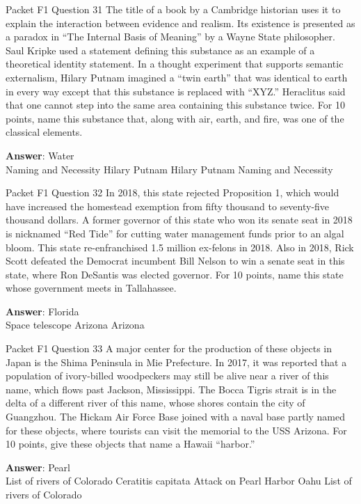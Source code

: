 \begin{frame}{Packet F1 Question 31}
The title of a book by a Cambridge historian uses it to explain the interaction between evidence and realism. Its existence is presented as a paradox in ``The Internal Basis of Meaning'' by a Wayne State philosopher. Saul Kripke used a statement defining this substance as an example   of a theoretical identity   statement. In a thought experiment that supports semantic externalism, Hilary   Putnam imagined a “twin earth” that   was identical to earth in every way except that this substance is replaced with   “XYZ.” Heraclitus said that one cannot step into the same area containing this substance twice. For 10 points, name this substance that, along with air, earth,   and fire, was one of the classical elements.  

\textbf{Answer}: Water\\
 Naming and Necessity
 Hilary Putnam
 Hilary Putnam
 Naming and Necessity
\end{frame}

\begin{frame}{Packet F1 Question 32}
In 2018, this state rejected   Proposition 1, which would have increased the homestead exemption from fifty thousand to seventy-five thousand dollars. A former governor of this state who won its senate seat in 2018 is nicknamed “Red Tide” for cutting water management funds prior to an algal bloom. This state re-enfranchised 1.5 million ex-felons in 2018. Also in 2018, Rick Scott defeated     the Democrat   incumbent Bill Nelson to win a senate seat in this state, where Ron DeSantis was   elected governor. For 10 points, name this state whose government meets in Tallahassee.  

\textbf{Answer}: Florida\\
 Space telescope
 Arizona
 Arizona
\end{frame}

\begin{frame}{Packet F1 Question 33}
A major center for the production of these objects in Japan is the Shima Peninsula in Mie Prefecture. In 2017, it was reported that a population of ivory-billed woodpeckers may still be alive near a river of this name, which flows past Jackson, Mississippi. The Bocca Tigris strait is in the delta of a different river of this name, whose shores   contain the city of Guangzhou. The Hickam Air Force Base joined with a naval base partly named for these objects, where tourists can visit the memorial to the USS Arizona. For 10 points, give these objects that name a Hawaii “harbor.”        

\textbf{Answer}: Pearl\\
 List of rivers of Colorado
 Ceratitis capitata
 Attack on Pearl Harbor
 Oahu
 List of rivers of Colorado
\end{frame}

